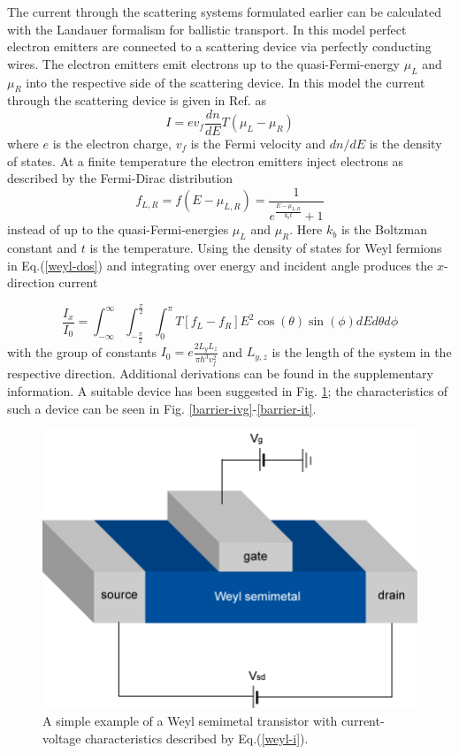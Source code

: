 \documentclass[prb,twocolumn,aps,superscriptaddress,showpacs,floatfix]{revtex4}
\begin{document}
	The current through the scattering systems formulated earlier can be calculated with the Landauer formalism for ballistic transport. In this model perfect electron emitters are connected to a scattering device via perfectly conducting wires. The electron emitters emit electrons up to the quasi-Fermi-energy $\mu_{L}$ and $\mu_{R}$ into the respective side of the scattering device. In this model the current through the scattering device is given in Ref.\cite{b6} as
\begin{equation}
	I=ev_{f}\frac{dn}{dE}T\left(\mu_{L}-\mu_{R}\right)
	\label{current-dos}
\end{equation}
where $e$ is the electron charge, $v_{f}$ is the Fermi velocity and $dn/dE$ is the density of states. At a finite temperature the electron emitters inject electrons as described by the Fermi-Dirac distribution
\begin{equation}
	f_{L,R}=f\left(E-\mu_{L,R}\right)=\frac{1}{e^{\frac{E-\mu_{L,R}}{k_{b}t}}+1}
\end{equation}
instead of up to the quasi-Fermi-energies $\mu_{L}$ and $\mu_{R}$. Here $k_{b}$ is the Boltzman constant and $t$ is the temperature. Using the density of states for Weyl fermions in Eq.(\ref{weyl-dos}) and integrating over energy and incident angle produces the $x$-direction current

		\begin{equation}
			\frac{I_{x}}{I_{0}}=\int^{\infty}_{-\infty}\int^{\frac{\pi}{2}}_{-\frac{\pi}{2}}\int^{\pi}_{0}T\left[f_{L}-f_{R}\right]E^{2}\cos\left(\theta\right)\sin\left(\phi\right)dEd\theta d\phi
			\label{weyl-i}
		\end{equation}
with the group of constants $I_{0}=e\frac{2L_{y}L_{z}}{\pi\hbar^{3}v_{f}^{2}}$ and $L_{y,z}$ is the length of the system in the respective direction. Additional derivations can be found in the supplementary information. A suitable device has been suggested in Fig. \ref{transistor}; the characteristics of such a device can be seen in Fig. \ref{barrier-ivg}-\ref{barrier-it}.

\begin{figure}
	\centerline{\includegraphics[scale=0.25]{transistor}}
	\caption{A simple example of a Weyl semimetal transistor with current-voltage characteristics described by Eq.(\ref{weyl-i}).}
	\label{transistor}
\end{figure}
\end{document}
